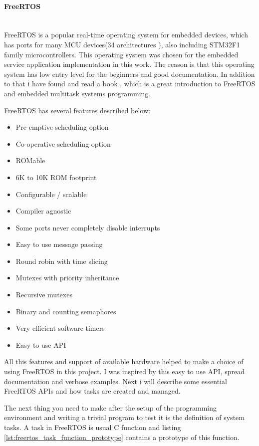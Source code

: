 \paragraph{FreeRTOS} ~\\
FreeRTOS is a popular real-time operating system for embedded devices, which has
ports for many MCU devices(34 architectures \cite{FreeRTOS_website}),
also including STM32F1 family microcontrollers.
This operating system was chosen for the embedded service application implementation in this work.
The reason is that this operating system has low entry level for the beginners and good documentation.
In addition to that i have found and read a book \cite{barry2010using}, which is a great introduction to FreeRTOS and embedded multitask systems programming. 

FreeRTOS has several features described below\cite{FreeRTOS_website}:
\begin{itemize}
\item Pre-emptive scheduling option 
\item Co-operative scheduling option
\item ROMable
\item 6K to 10K ROM footprint
\item Configurable / scalable
\item Compiler agnostic
\item Some ports never completely disable interrupts
\item Easy to use message passing
\item Round robin with time slicing
\item Mutexes with priority inheritance
\item Recursive mutexes
\item Binary and counting semaphores
\item Very efficient software timers
\item Easy to use API 
\end{itemize}

All this features and support of available hardware helped to make a choice of using FreeRTOS in this project.
I was inspired by this easy to use API, spread documentation and verbose examples.
Next i will describe some essential FreeRTOS APIs  and how tasks are created and managed.

The next thing you need to make after the setup of the programming environment and writing a trivial program to test it is the definition of system tasks.
A task in FreeRTOS is usual C function and
listing \ref{lst:freertos_task_function_prototype} contains a prototype of this
function.


